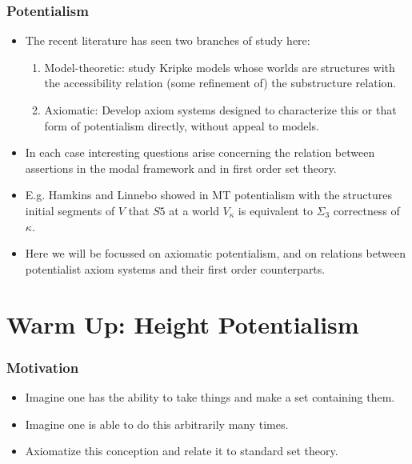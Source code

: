 \documentclass{beamer}
\begin{document}
\begin{frame}
\frametitle{Potentialism}
    \begin{itemize}
        \item The recent literature has seen two branches of study here:
        \begin{enumerate}
            \item<2->   Model-theoretic: study Kripke models whose worlds are 
                        structures with the accessibility relation (some refinement of)
                        the substructure relation.
            \item<3->   Axiomatic: Develop axiom systems designed to characterize 
                        this or that form of potentialism directly, without appeal to models.
        \end{enumerate}
        \item<4->   In each case interesting questions arise concerning the relation 
                    between assertions in the modal framework and in first order set theory.
        \item<5->   E.g. Hamkins and Linnebo showed in MT potentialism with the structures
                    initial segments of $V$ that $S5$ at a world $V_\kappa$ is equivalent 
                    to $\Sigma_3$ correctness of $\kappa$.
        \item<6->   Here we will be focussed on axiomatic potentialism, and on 
                    relations between potentialist axiom systems and their first order counterparts.
    \end{itemize}
    
\end{frame}

\section{Warm Up: Height Potentialism}

\begin{frame}
    \frametitle{Motivation}
    \begin{itemize}
        \item<2->   Imagine one has the ability to take things and 
                    make a set containing them.
        \item<3->   Imagine one is able to do this arbitrarily many times.
        \item<4->   Axiomatize this conception and relate it to standard set theory.
    \end{itemize}
\end{frame}
\end{document}
